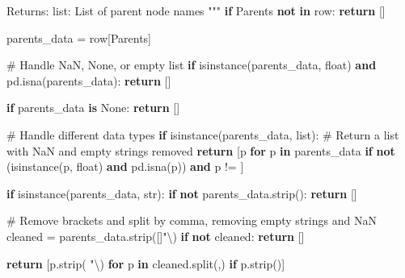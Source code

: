 \documentclass[
  11pt,
  letterpaper,
]{book}
\newenvironment{Shaded}{\begin{snugshade}}{\end{snugshade}}
\newcommand{\BuiltInTok}[1]{\textcolor[rgb]{0.00,0.23,0.31}{#1}}
\newcommand{\CharTok}[1]{\textcolor[rgb]{0.13,0.47,0.30}{#1}}
\newcommand{\CommentTok}[1]{\textcolor[rgb]{0.37,0.37,0.37}{#1}}
\newcommand{\ControlFlowTok}[1]{\textcolor[rgb]{0.00,0.23,0.31}{\textbf{#1}}}
\newcommand{\KeywordTok}[1]{\textcolor[rgb]{0.00,0.23,0.31}{\textbf{#1}}}
\newcommand{\NormalTok}[1]{\textcolor[rgb]{0.00,0.23,0.31}{#1}}
\newcommand{\OperatorTok}[1]{\textcolor[rgb]{0.37,0.37,0.37}{#1}}
\newcommand{\StringTok}[1]{\textcolor[rgb]{0.13,0.47,0.30}{#1}}
\newcommand{\VariableTok}[1]{\textcolor[rgb]{0.07,0.07,0.07}{#1}}
\begin{document}
\begin{Shaded}
\begin{Highlighting}[]
\CommentTok{    Returns:}
\CommentTok{        list: List of parent node names}
\CommentTok{    """}
    \ControlFlowTok{if} \StringTok{\textquotesingle{}Parents\textquotesingle{}} \KeywordTok{not} \KeywordTok{in}\NormalTok{ row:}
        \ControlFlowTok{return}\NormalTok{ []}

\NormalTok{    parents\_data }\OperatorTok{=}\NormalTok{ row[}\StringTok{\textquotesingle{}Parents\textquotesingle{}}\NormalTok{]}

    \CommentTok{\# Handle NaN, None, or empty list}
    \ControlFlowTok{if} \BuiltInTok{isinstance}\NormalTok{(parents\_data, }\BuiltInTok{float}\NormalTok{) }\KeywordTok{and}\NormalTok{ pd.isna(parents\_data):}
        \ControlFlowTok{return}\NormalTok{ []}

    \ControlFlowTok{if}\NormalTok{ parents\_data }\KeywordTok{is} \VariableTok{None}\NormalTok{:}
        \ControlFlowTok{return}\NormalTok{ []}

    \CommentTok{\# Handle different data types}
    \ControlFlowTok{if} \BuiltInTok{isinstance}\NormalTok{(parents\_data, }\BuiltInTok{list}\NormalTok{):}
        \CommentTok{\# Return a list with NaN and empty strings removed}
        \ControlFlowTok{return}\NormalTok{ [p }\ControlFlowTok{for}\NormalTok{ p }\KeywordTok{in}\NormalTok{ parents\_data }\ControlFlowTok{if} \KeywordTok{not}\NormalTok{ (}\BuiltInTok{isinstance}\NormalTok{(p, }\BuiltInTok{float}\NormalTok{) }\KeywordTok{and}\NormalTok{ pd.isna(p)) }\KeywordTok{and}\NormalTok{ p }\OperatorTok{!=} \StringTok{\textquotesingle{}\textquotesingle{}}\NormalTok{]}

    \ControlFlowTok{if} \BuiltInTok{isinstance}\NormalTok{(parents\_data, }\BuiltInTok{str}\NormalTok{):}
        \ControlFlowTok{if} \KeywordTok{not}\NormalTok{ parents\_data.strip():}
            \ControlFlowTok{return}\NormalTok{ []}

        \CommentTok{\# Remove brackets and split by comma, removing empty strings and NaN}
\NormalTok{        cleaned }\OperatorTok{=}\NormalTok{ parents\_data.strip(}\StringTok{\textquotesingle{}[]"}\CharTok{\textbackslash{}\textquotesingle{}}\StringTok{\textquotesingle{}}\NormalTok{)}
        \ControlFlowTok{if} \KeywordTok{not}\NormalTok{ cleaned:}
            \ControlFlowTok{return}\NormalTok{ []}

        \ControlFlowTok{return}\NormalTok{ [p.strip(}\StringTok{\textquotesingle{} "}\CharTok{\textbackslash{}\textquotesingle{}}\StringTok{\textquotesingle{}}\NormalTok{) }\ControlFlowTok{for}\NormalTok{ p }\KeywordTok{in}\NormalTok{ cleaned.split(}\StringTok{\textquotesingle{},\textquotesingle{}}\NormalTok{) }\ControlFlowTok{if}\NormalTok{ p.strip()]}


\end{Highlighting}
\end{Shaded}
\end{document}

